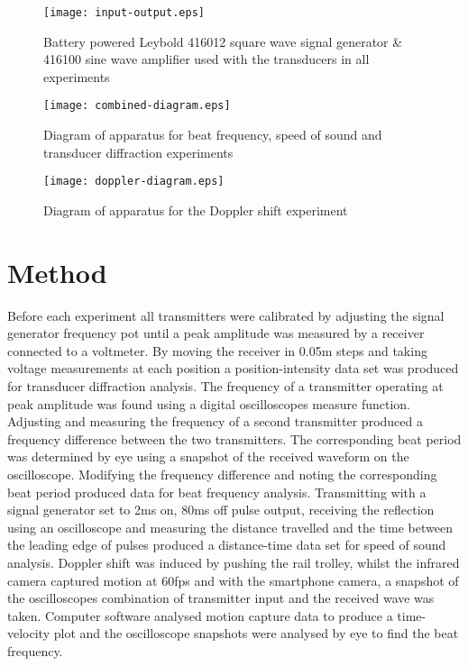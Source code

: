 \documentclass[a4paper,10pt,journal]{IEEEtran}
\begin{document}
\begin{figure}
	\centering
	\texttt{[image: input-output.eps]}
	\caption{Battery powered Leybold 416012 square wave signal generator \& 416100 sine wave amplifier \cite{echo-sounder-principles} used with the transducers in all experiments}
	\label{input-output}
\end{figure}

\begin{figure}
	\centering
	\texttt{[image: combined-diagram.eps]}
	\caption{Diagram of apparatus for beat frequency, speed of sound and transducer diffraction experiments}
	\label{combined-diagram}
\end{figure}

\begin{figure}
	\centering
	\texttt{[image: doppler-diagram.eps]}
	\caption{Diagram of apparatus for the Doppler shift experiment}
	\label{doppler-diagram}
\end{figure}


\section{Method}

Before each experiment all transmitters were calibrated by adjusting the signal generator frequency pot until a peak amplitude was measured by a receiver connected to a voltmeter. By moving the receiver in 0.05m steps and taking voltage measurements at each position a position-intensity data set was produced for transducer diffraction analysis.
The frequency of a transmitter operating at peak amplitude was found using a digital oscilloscopes measure function. Adjusting and measuring the frequency of a second transmitter produced a frequency difference between the two transmitters. The corresponding beat period  was determined by eye using a snapshot of the received waveform on the oscilloscope. Modifying the frequency difference and noting the corresponding beat period produced data for beat frequency analysis.
Transmitting with a signal generator set to 2ms on, 80ms off pulse output, receiving the reflection using an oscilloscope and measuring the distance travelled and the time between the leading edge of pulses produced a distance-time data set for speed of sound analysis.
Doppler shift was induced by pushing the rail trolley, whilst the infrared camera captured motion at 60fps and with the smartphone camera, a snapshot of the oscilloscopes combination of transmitter input and the received wave was taken. Computer software analysed motion capture data to produce a time-velocity plot and the oscilloscope snapshots were analysed by eye to find the beat frequency.
\end{document}
